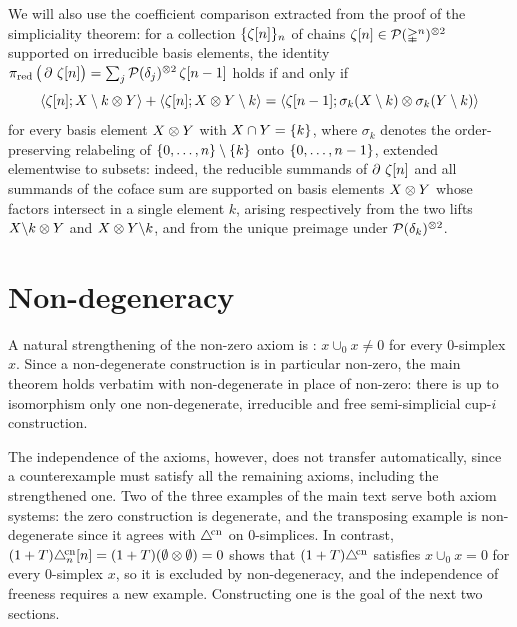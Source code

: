 \documentclass{amsart}
\begin{document}
We will also use the coefficient comparison extracted from the proof of the simpliciality theorem:
for a collection $\{\zeta[n]\}_n$ of chains $\zeta[n] \in \mathcal{P}(\mathbb{\Delta}^n)^{\otimes 2}$ supported on irreducible basis elements, the identity $\operatorname{\pi_{\text{red}}}\big(\operatorname{\partial}\, \zeta[n]\big) = \sum_j \mathcal{P}(\delta_j)^{\otimes 2}\, \zeta[n-1]$ holds if and only if
\begin{equation}\label{eq:coefficient_comparison}
	\langle \zeta[n] ; X \setminus k \otimes Y \rangle + \langle \zeta[n] ; X \otimes Y \setminus k \rangle =
	\langle \zeta[n-1] ; \sigma_k(X \setminus k) \otimes \sigma_k(Y \setminus k) \rangle
\end{equation}
for every basis element $X \otimes Y$ with $X \cap Y = \{k\}$, where $\sigma_k$ denotes the order-preserving relabeling of $\{0, \dots, n\} \setminus \{k\}$ onto $\{0, \dots, n-1\}$, extended elementwise to subsets:
indeed, the reducible summands of $\operatorname{\partial}\, \zeta[n]$ and all summands of the coface sum are supported on basis elements $X \otimes Y$ whose factors intersect in a single element $k$, arising respectively from the two lifts $X {\setminus} k \otimes Y$ and $X \otimes Y {\setminus} k$, and from the unique preimage under $\mathcal{P}(\delta_k)^{\otimes 2}$.

\section{Non-degeneracy}\label{s:nondeg}

A natural strengthening of the non-zero axiom is : $x \cup_0 x \neq 0$ for every $0$-simplex $x$.
Since a non-degenerate construction is in particular non-zero, the main theorem holds verbatim with non-degenerate in place of non-zero: there is up to isomorphism only one non-degenerate, irreducible and free semi-simplicial \mbox{cup-$i$} construction.

The independence of the axioms, however, does not transfer automatically, since a counterexample must satisfy all the remaining axioms, including the strengthened one.
Two of the three examples of the main text serve both axiom systems: the zero construction is degenerate, and the transposing example is non-degenerate since it agrees with $\triangle^{\!\mathrm{cn}}$ on $0$-simplices.
In contrast, $(1+T)\triangle^{\!\mathrm{cn}}_n[n] = (1+T)(\emptyset \otimes \emptyset) = 0$ shows that $(1+T)\triangle^{\!\mathrm{cn}}$ satisfies $x \cup_0 x = 0$ for every $0$-simplex $x$, so it is excluded by non-degeneracy, and the independence of freeness requires a new example.
Constructing one is the goal of the next two sections.
\end{document}
